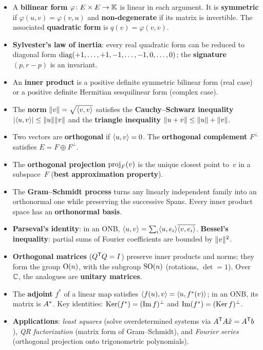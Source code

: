 \begin{itemize}
  \item A \textbf{bilinear form} $\varphi\colon E\times E\to{\mathbb{K}}$ is
    linear in each argument.  It is \textbf{symmetric} if
    $\varphi(u,v) = \varphi(v,u)$ and \textbf{non-degenerate} if its
    matrix is invertible.  The associated \textbf{quadratic form} is
    $q(v) = \varphi(v,v)$.

  \item \textbf{Sylvester's law of inertia}: every real quadratic form
    can be reduced to diagonal form $\operatorname{diag}(+1,\ldots,+1,-1,\ldots,-1,
    0,\ldots,0)$; the \textbf{signature} $(p,r-p)$ is an invariant.

  \item An \textbf{inner product} is a positive definite symmetric
    bilinear form (real case) or a positive definite Hermitian
    sesquilinear form (complex case).

  \item The \textbf{norm} $\lVert v\rVert = \sqrt{\langle v,v\rangle}$ satisfies
    the \textbf{Cauchy--Schwarz inequality}
    $\lvert\langle u,v\rangle\rvert\leq\lVert u\rVert\lVert v\rVert$ and the
    \textbf{triangle inequality}
    $\lVert u+v\rVert\leq\lVert u\rVert+\lVert v\rVert$.

  \item Two vectors are \textbf{orthogonal} if $\langle u,v\rangle = 0$.  The
    \textbf{orthogonal complement} $F^{\perp}$ satisfies
    $E = F\oplus F^{\perp}$.

  \item The \textbf{orthogonal projection} $\operatorname{proj}_F(v)$ is the unique
    closest point to~$v$ in a subspace~$F$ (\textbf{best approximation
    property}).

  \item The \textbf{Gram--Schmidt process} turns any linearly
    independent family into an orthonormal one while preserving the
    successive Spans.  Every inner product space has an
    \textbf{orthonormal basis}.

  \item \textbf{Parseval's identity}: in an ONB,
    $\langle u,v\rangle = \sum_i\langle u,e_i\rangle\overline{\langle v,e_i\rangle}$.
    \textbf{Bessel's inequality}: partial sums of Fourier coefficients
    are bounded by $\lVert v\rVert^2$.

  \item \textbf{Orthogonal matrices} (${Q}^{\mathsf{T}}Q = I$) preserve
    inner products and norms; they form the group $\operatorname{O}(n)$, with the
    subgroup $\operatorname{SO}(n)$ (rotations, $\det = 1$).  Over~${\mathbb{C}}$, the
    analogues are \textbf{unitary matrices}.

  \item The \textbf{adjoint} $f^*$ of a linear map satisfies
    $\langle f(u),v\rangle = \langle u,f^*(v)\rangle$; in an ONB, its matrix is
    ${A}^{*}$.  Key identities:
    $\operatorname{Ker}(f^*) = (\operatorname{Im} f)^{\perp}$ and
    $\operatorname{Im}(f^*) = (\operatorname{Ker} f)^{\perp}$.

  \item \textbf{Applications}: \emph{least squares} (solve overdetermined
    systems via ${A}^{\mathsf{T}}A\hat{x} = {A}^{\mathsf{T}}b$), \emph{QR
    factorization} (matrix form of Gram--Schmidt), and \emph{Fourier
    series} (orthogonal projection onto trigonometric polynomials).
\end{itemize}
